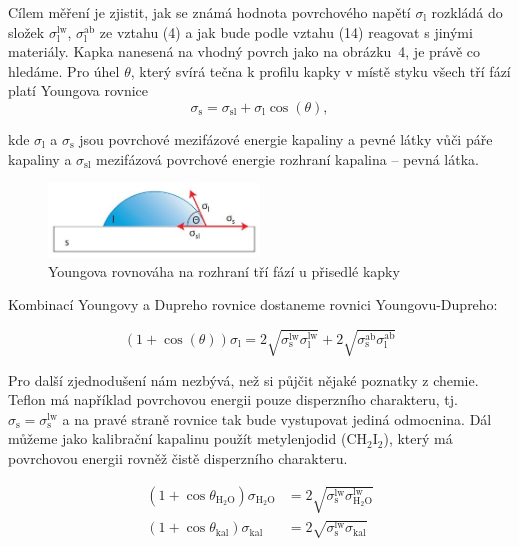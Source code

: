 \documentclass[a4paper,11pt]{article}
\begin{document}
Cílem měření je zjistit, jak se známá hodnota povrchového napětí $\sigma_{\text{l}}$ rozkládá do složek $\sigma_{\text{l}}^{\text{lw}}$, $\sigma_{\text{l}}^{\text{ab}}$ ze vztahu (4) a jak bude podle vztahu (14) reagovat s jinými materiály.  Kapka nanesená na vhodný povrch jako na obrázku~4, je právě co hledáme. Pro úhel $\theta$, který svírá tečna k profilu kapky v místě styku všech tří fází platí Youngova rovnice \\

\begin{equation}
\sigma_{\text{s}} = \sigma_{\text{sl}} + \sigma_{\text{l}}\cos(\theta),
\end{equation}

\noindent
kde $\sigma_{\text{l}}$ a $\sigma_{\text{s}}$ jsou povrchové mezifázové energie kapaliny a pevné látky vůči páře kapaliny a $\sigma_{\text{sl}}$ mezifázová povrchové energie rozhraní kapalina – pevná látka.

\begin{figure}[htpb]
  \centering
  \includegraphics[width=0.5\textwidth]{young.jpg}
  \caption{Youngova rovnováha na rozhraní tří fází u přisedlé kapky}
\end{figure}

Kombinací Youngovy a Dupreho rovnice dostaneme rovnici Youngovu-Dupreho:

\begin{equation}
  (1 + \cos(\theta))\sigma_{\text{l}} =  2 \sqrt{\sigma_{\text{s}}^{\text{lw}}\sigma_{\text{l}}^{\text{lw}}} + 2\sqrt{\sigma_{\text{s}}^{\text{ab}}\sigma_{\text{l}}^{\text{ab}}}
\end{equation}

Pro další zjednodušení nám nezbývá, než si půjčit nějaké poznatky z chemie. Teflon má například povrchovou energii pouze disperzního charakteru, tj. $\sigma_{\text{s}} = \sigma_{\text{s}}^{\text{lw}}$ a na pravé straně rovnice tak bude vystupovat jediná odmocnina. Dál můžeme jako kalibrační kapalinu použít metylenjodid (CH$_{2}$I$_{2}$), který má povrchovou energii rovněž čistě disperzního charakteru.

\begin{align}
  (1 + \cos\theta_{\text{H}_2\text{O}}) \sigma_{\text{H}_2\text{O}} &= 2 \sqrt{\sigma_{\text{s}}^{\text{lw}} \sigma_{\text{H}_2\text{O}}^{\text{lw}}} \\
  (1 + \cos\theta_{\text{kal}}) \sigma_{\text{kal}} &= 2 \sqrt{\sigma_{\text{s}}^{\text{lw}} \sigma_{\text{kal}}}
\end{align}
\end{document}

